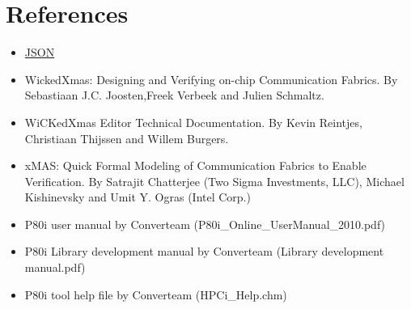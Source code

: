 \documentclass[a4paper,11pt,final]{article}
\begin{document}
\newpage
\section{References}
\begin{itemize}
	\item \href{http://www.json.org/}{JSON}
	\item WickedXmas: Designing and Verifying on-chip Communication Fabrics. By Sebastiaan J.C. Joosten,Freek Verbeek and Julien Schmaltz.
	\item WiCKedXmas Editor Technical Documentation. By Kevin Reintjes, Christiaan Thijssen and Willem Burgers.
	\item xMAS: Quick Formal Modeling of Communication Fabrics to Enable Verification. By Satrajit Chatterjee (Two Sigma Investments, LLC), Michael Kishinevsky and Umit Y. Ogras (Intel Corp.)
	\item P80i user manual by Converteam (P80i\_Online\_UserManual\_2010.pdf)
	\item P80i Library development manual by Converteam (Library development manual.pdf)
	\item P80i tool help file by Converteam (HPCi\_Help.chm)
\end{itemize}
\end{document}
